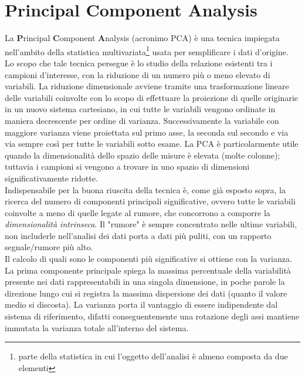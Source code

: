 \section{Principal Component Analysis}
\label{PCA}

La \textbf{P}rincipal \textbf{C}omponent \textbf{A}nalysis (acronimo PCA) \`e una tecnica impiegata nell'ambito della statistica multivariata\footnote{parte della statistica in cui l'oggetto dell'analisi \`e almeno composta da due elementi} usata per semplificare i dati d'origine.\\
Lo scopo che tale tecnica persegue \`e lo studio della relazione esistenti tra i campioni d'interesse, con la riduzione di un numero pi\`u o meno elevato di variabili. La riduzione dimensionale avviene tramite una trasformazione lineare delle variabili coinvolte con lo scopo di effettuare la proiezione di quelle originarie in un nuovo sistema cartesiano, in cui tutte le variabili vengono ordinate in maniera decrescente per ordine di varianza. Successivamente la variabile con maggiore varianza viene proiettata sul primo asse, la seconda sul secondo e via via sempre cos\`i per tutte le variabili sotto esame. La PCA \`	e particolarmente utile quando la dimensionalit\`a dello spazio delle misure \`e elevata (molte colonne); tuttavia i campioni si vengono a trovare in uno spazio di dimensioni significativamente ridotte.\\
Indispensabile per la buona riuscita della tecnica \`e, come gi\`a esposto sopra, la ricerca del numero di componenti principali significative, ovvero tutte le variabili coinvolte a meno di quelle legate al rumore, che concorrono a comporre la \textit{dimensionalit\`a intrinseca}. Il "rumore" \`e sempre concentrato nelle ultime variabili, non includerle nell'analisi dei dati porta a dati pi\`u puliti, con un rapporto segnale/rumore pi\`u alto.\\
Il calcolo di quali sono le componenti pi\`u significative si ottiene con la varianza. La prima componente principale spiega la massima percentuale della variabilit\`a presente nei dati rappresentabili in una singola dimensione, in poche parole la direzione lungo cui si registra la massima dispersione dei dati (quanto il valore medio si discosta). La varianza porta il vantaggio di essere indipendente dal sistema di riferimento, difatti conseguentemente una rotazione degli assi mantiene immutata la varianza totale all'interno del sistema.

